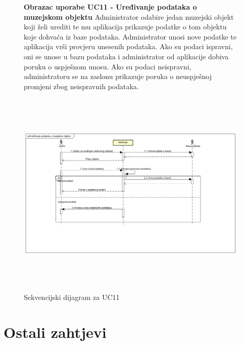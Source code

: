 				\begin{figure}[H]
					\textbf{Obrazac uporabe UC11 - Uređivanje podataka o muzejskom objektu} 
					\newline
					\newline
				    Administrator odabire jedan muzejski objekt koji želi urediti te mu aplikacija prikazuje podatke o tom objektu koje dohvaća iz baze podataka. Administrator unosi nove podatke te aplikacija vrši provjeru unesenih podataka. Ako su podaci ispravni, oni se unose u bazu podataka i administrator od aplikacije dobiva poruku o uspješnom unosu. Ako su podaci neispravni, administratoru se na zaslonu prikazuje poruka o neuspješnoj promjeni zbog neispravnih podataka. \par
					\includegraphics[width=170mm,height=100mm]{slike/Uredivanje_podataka_o_muzejskom_objektu.png} 
					\newline
					\centering
					\caption{Sekvencijski dijagram za UC11}
					\label{fig:promjene}
				\end{figure}



\newpage
\section{Ostali zahtjevi}

